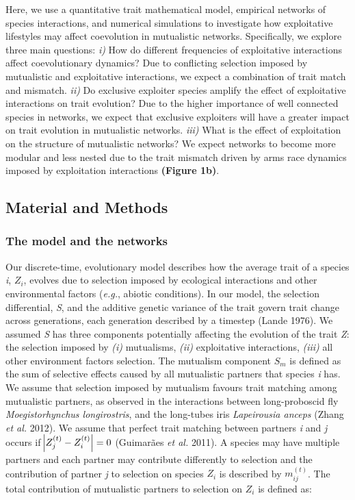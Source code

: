 \documentclass[a4paper, 12pt]{article}
\begin{document}
Here, we use a quantitative trait mathematical model, empirical networks of species interactions, and numerical simulations to investigate how exploitative lifestyles may affect coevolution in mutualistic networks. Specifically, we explore three main questions: \textit{i)} How do different frequencies of exploitative interactions affect  coevolutionary dynamics? Due to conflicting selection imposed by mutualistic and exploitative interactions, we expect a combination of trait match and mismatch. \textit{ii)} Do exclusive exploiter species amplify the effect of exploitative interactions on trait evolution? Due to the higher importance of well connected species in networks, we expect that exclusive exploiters will have a greater impact on trait evolution in mutualistic networks. \textit{iii)} What is the effect of exploitation on the structure of mutualistic networks? We expect networks to become more modular and less nested due to the trait mismatch driven by arms race dynamics imposed by  exploitation interactions \textbf{(Figure 1b)}.

\subsection*{Material and Methods}

\subsubsection*{The model and the networks}
Our discrete-time, evolutionary model describes how the average trait of a species \textit{i}, $Z_{i}$, evolves due to selection imposed by ecological interactions and other environmental factors (\textit{e.g.}, abiotic conditions). In our model, the selection differential, \textit{S}, and the additive genetic variance of the trait govern trait change across generations, each generation described by a timestep (Lande 1976). We assumed \textit{S} has three components potentially affecting the evolution of the trait \textit{Z}: the selection imposed by \textit{(i)} mutualisms, \textit{(ii)} exploitative interactions, \textit{(iii)} all other environment factors selection. The mutualism component $S_{m}$ is defined as the sum of selective effects caused by all mutualistic partners that species \textit{i} has. We assume that selection imposed by mutualism favours trait matching among mutualistic partners, as observed in the interactions between long-proboscid fly \textit{Moegistorhynchus longirostris}, and the long-tubes iris \textit{Lapeirousia anceps} (Zhang \textit{et al.} 2012). We assume that perfect trait matching between partners \textit{i} and \textit{j} occurs if $\abs{Z^{(t)}_{j} - Z^{(t)}_{i}} = 0$ (Guimarães \textit{et al.} 2011). A species may have multiple partners and each partner may contribute differently to selection and the contribution of partner \textit{j} to selection on species $Z_{i}$ is described by $m^{(t)}_{ij}$. The total contribution of mutualistic partners to selection on $Z_{i}$ is defined as: 
\end{document}
